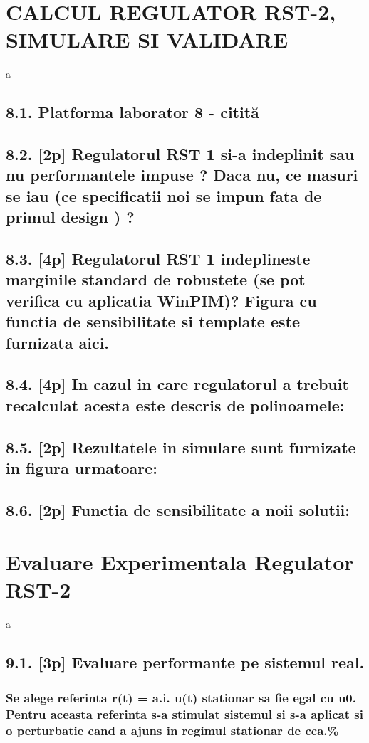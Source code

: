 \documentclass[12pt,english]{article}
\begin{document}
\section {CALCUL REGULATOR RST-2, SIMULARE SI VALIDARE }
a
\subsection {8.1. Platforma laborator 8 - citită }
\subsection {8.2. [2p] Regulatorul RST 1 si-a indeplinit sau nu performantele impuse ?  Daca nu, ce masuri se iau (ce specificatii noi se impun fata de primul design ) ? }
\subsection {8.3. [4p] Regulatorul RST 1 indeplineste marginile standard de robustete (se pot verifica cu aplicatia WinPIM)?   Figura cu functia de sensibilitate si template este furnizata aici. }
\subsection {8.4. [4p] In cazul in care regulatorul a trebuit recalculat acesta este descris de polinoamele: }
\subsection {8.5. [2p] Rezultatele in simulare sunt furnizate in figura urmatoare: }
\subsection {8.6. [2p] Functia de sensibilitate a noii solutii: }

\section {Evaluare Experimentala Regulator RST-2 }
a
\subsection {9.1. [3p] Evaluare performante pe sistemul real. }
\subsubsection {Se alege referinta r(t) = a.i. u(t) stationar sa fie egal cu u0. Pentru aceasta referinta s-a stimulat sistemul si s-a aplicat si o perturbatie cand a ajuns in regimul stationar de cca.\% }
\end{document}
